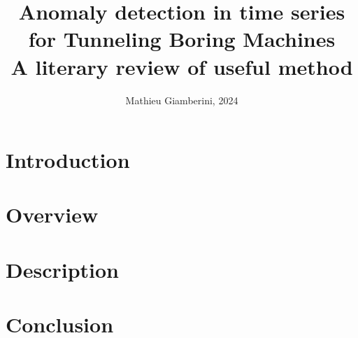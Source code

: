 \documentclass[twocolumn]{article}
\title{Anomaly detection in time series for Tunneling Boring Machines \\ \small{A literary review of useful method}}
\author{Mathieu Giamberini, 2024}
\date{}
\begin{document}
    \maketitle
    
    \section*{Introduction}
        


    \section{Overview}
        


    \section{Description}
        


    \section*{Conclusion}
        
    
            
    \newpage
    \printbibliography

    \newpage
    \onecolumn
    
\end{document}
